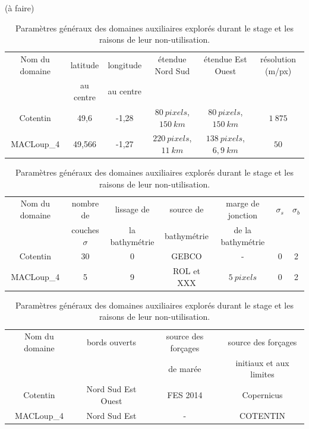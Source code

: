 \documentclass[10pt,a4paper,titlepage]{article}
\begin{document}
    \begin{table}[h!]
        \centering
        (à faire)
        \begin{tabular}{||c||c|c|c|c|c|}
            \hline
            Nom du domaine & latitude & longitude & étendue Nord Sud & étendue Est Ouest & résolution (m/px)\\
            & au centre & au centre &  &  & \\
            \hline
            Cotentin & 49,6 & -1,28 & $80~pixels$, $150~km$ & $80~pixels$, $150~km$ & $1~875$\\
            MACLoup\_4 & 49,566 & -1,27 & $220~pixels$, $11~km$ & $138~pixels$, $6,9~km$ & $50$\\
            \hline
        \end{tabular}\newline
        
        \begin{tabular}{||c||c|c|c|c|c|c|}
            \hline
            Nom du domaine & nombre de & lissage de & source de & marge de jonction & $\sigma_{s}$ & $\sigma_{b}$ \\
            & couches $\sigma$ & la bathymétrie & bathymétrie & de la bathymétrie &  & \\
            \hline
            Cotentin & 30 & 0 & GEBCO & - & 0  & 2 \\
            MACLoup\_4 & 5 & 9 & ROL et XXX & $5~pixels$ & 0 & 2 \\
            \hline
        \end{tabular}\newline
        
        \begin{tabular}{||c||c|c|c|}
            \hline
            Nom du domaine & bords ouverts & source des forçages & source des forçages \\
            &  & de marée & initiaux et aux limites \\
            \hline
            Cotentin & Nord Sud Est Ouest & FES 2014 & Copernicus \\
            MACLoup\_4 & Nord Sud Est & - & COTENTIN \\
            \hline
        \end{tabular}
        \caption{
            Paramètres généraux des domaines auxiliaires explorés durant le stage et les raisons de leur non-utilisation.
        }
        \label{anx:param_generaux_aux}
    \end{table}
    
\end{document}
